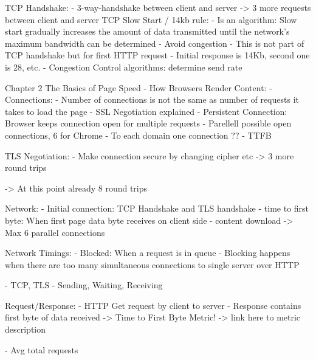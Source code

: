TCP Handshake:
- 3-way-handshake between client and server
-> 3 more requests between client and server
TCP Slow Start / 14kb rule:
- Is an algorithm: Slow start gradually increases the amount of data transmitted until the network's maximum bandwidth can be determined
- Avoid congestion
- This is not part of TCP handshake but for first HTTP request
- Initial response is 14Kb, second one is 28, etc.
- Congestion Control algorithms: determine send rate

Chapter 2 The Basics of Page Speed - How Browsers Render Content:
- Connections:
- Number of connections is not the same as number of requests it takes to load the page
- SSL Negotiation explained
- Persistent Connection: Browser keeps connection open for multiple requests
- Parellell possible open connections, 6 for Chrome
- To each domain one connection ??
- TTFB



TLS Negotiation:
- Make connection secure by changing cipher etc
-> 3 more round trips

-> At this point already 8 round trips

Network:
- Initial connection: TCP Handshake and TLS handshake
- time to first byte: When first page data byte receives on client side
- content download
-> Max 6 parallel connections


Network Timings:
- Blocked: When a request is in queue
- Blocking happens when there are too many simultaneous connections to single server over HTTP

- TCP, TLS
- Sending, Waiting, Receiving




Request/Response:
- HTTP Get request by client to server
- Response contains first byte of data received -> Time to First Byte Metric! -> link here to metric description


- Avg total requests %



